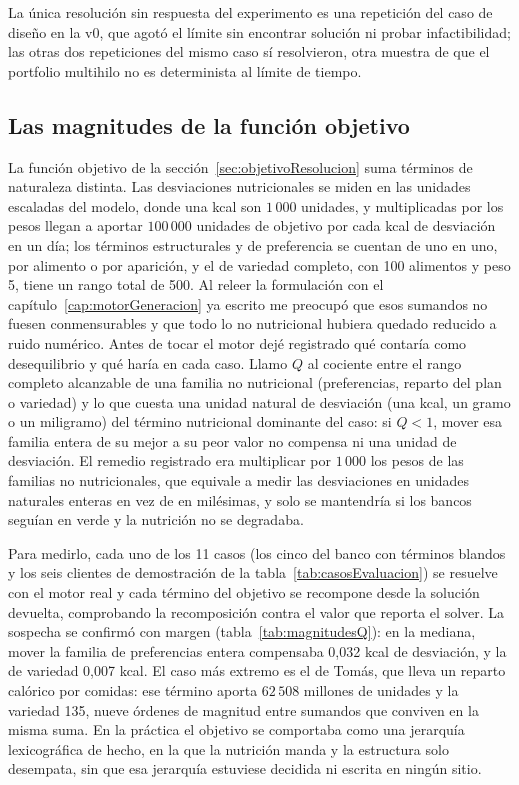 La única resolución sin respuesta del experimento es una repetición del caso de diseño en la v0, que agotó el límite sin encontrar solución ni probar infactibilidad; las otras dos repeticiones del mismo caso sí resolvieron, otra muestra de que el portfolio multihilo no es determinista al límite de tiempo.

\subsection{Las magnitudes de la función objetivo}
\label{sec:evalMagnitudes}

La función objetivo de la sección~\ref{sec:objetivoResolucion} suma términos de naturaleza distinta. Las desviaciones nutricionales se miden en las unidades escaladas del modelo, donde una kcal son $1\,000$ unidades, y multiplicadas por los pesos llegan a aportar $100\,000$ unidades de objetivo por cada kcal de desviación en un día; los términos estructurales y de preferencia se cuentan de uno en uno, por alimento o por aparición, y el de variedad completo, con 100 alimentos y peso 5, tiene un rango total de 500. Al releer la formulación con el capítulo~\ref{cap:motorGeneracion} ya escrito me preocupó que esos sumandos no fuesen conmensurables y que todo lo no nutricional hubiera quedado reducido a ruido numérico. Antes de tocar el motor dejé registrado qué contaría como desequilibrio y qué haría en cada caso. Llamo $Q$ al cociente entre el rango completo alcanzable de una familia no nutricional (preferencias, reparto del plan o variedad) y lo que cuesta una unidad natural de desviación (una kcal, un gramo o un miligramo) del término nutricional dominante del caso: si $Q<1$, mover esa familia entera de su mejor a su peor valor no compensa ni una unidad de desviación. El remedio registrado era multiplicar por $1\,000$ los pesos de las familias no nutricionales, que equivale a medir las desviaciones en unidades naturales enteras en vez de en milésimas, y solo se mantendría si los bancos seguían en verde y la nutrición no se degradaba.

Para medirlo, cada uno de los 11 casos (los cinco del banco con términos blandos y los seis clientes de demostración de la tabla~\ref{tab:casosEvaluacion}) se resuelve con el motor real y cada término del objetivo se recompone desde la solución devuelta, comprobando la recomposición contra el valor que reporta el solver. La sospecha se confirmó con margen (tabla~\ref{tab:magnitudesQ}): en la mediana, mover la familia de preferencias entera compensaba 0,032 kcal de desviación, y la de variedad 0,007 kcal. El caso más extremo es el de Tomás, que lleva un reparto calórico por comidas: ese término aporta $62\,508$ millones de unidades y la variedad 135, nueve órdenes de magnitud entre sumandos que conviven en la misma suma. En la práctica el objetivo se comportaba como una jerarquía lexicográfica de hecho, en la que la nutrición manda y la estructura solo desempata, sin que esa jerarquía estuviese decidida ni escrita en ningún sitio.

